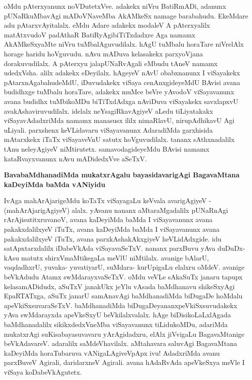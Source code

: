 \noindent
oMdu pAterxyanunx noVDutetxVve. adakekx niVru BatiRmADi, adanunx pUNaRkuMbavAgi mADoVNa\-veMba AkAMkeSx namage barabahudu. EkeMdare adu pAtarxvAyitalalx. eMdu Adare adakekx modaleV A pAterxyalilx matAtxvudoV padAthaR BatiRyAgibiTiTxdadxre Aga namamx AkAMkeSxyaMte niVru tuMbalAguvu\-dilalx. hAgU tuMbalu horaTare niVrelAlx horage haridu hoVguvudu. nAvu mADuva kela\-sakekx parxyoVjana dorakuvudilalx. A pAterxyu jalapUNaRvAgali eMbudu tAneV namamx udedxVsha. alilx adakekx eDeyilalx. hAgeyeV nAvU obabxnanunx I viSayakekx pAtarxnAgabahudeMdU, iDuvudakekx viSaya cenAnx\-gideyeMdU BAvisi avana budidhxge tuMbalu horaTare, adakekx muMce beVre yAvodoV viSayavanunx avana budidhx tuMbikoMDu biTiTxdAdxga nAviDuva viSayakekx savxlapxvU avakAshaviruvudilalx. idelalx neYsa\-giRkavAgiyeV aLedu tiLiyatakakx viSayavAdadxriMda namamx manasusx ililx nimaRlavU, nirupAdhikavU Agi uLiyali. parxshenx keVLidavaru viSayavanunx AdaradiMda garxhisida mAtarxkekx iTaTx viSayaveVnU satutx hoVguvudilalx. tananx sAthxnadalilx tAnu neleyAgiyeV niMtirutetx. samavodagideyeMdu BAvisi namamx kataRvayxvanunx nAvu mADidedxVve aSeTxV.

{\bigskip
\noindent
{\large\bf BavabaMdhanadiMda mukatxrAgalu bayasidavarigAgi BagavaMtana kaDeyiMda baMda vANiyidu}}\label{page251}
\medskip

\noindent
IvAga mahArAjarigeMdu koTaTx viSayagaLu keVvala avarigAgiyeV - (mahArAjarigAgiyeV) alalx. yAvanu nananx aMtaraMgadalilx pUNaRnAgi rArAjisutitxruvanoV, avana kaDeyiMda baMda I viSayavanunx avana pakakxdalilxyeV iTuTx, avana kaDeyiMda baMda I viSayavanunx avana pakakx\-dalilxyeV iTuTx, avana parxkAshakAkxgiyeV heVLidAdxgide. idu satApxtarxdalilx iDabeVkAda viSayavaSeTxV. nananx parxBuvu yAva duDuDx- kAsu matutx shirxVmaMtikegaLa meVlU niMtilalx. avanige bAlarU, vaqdadhxrU, yuvaka- yuvatiyarU, suMdara- kurUpigaLu elalxru oMdeV. avanige beVkAdudu Atamx swMdarayxvaSeTxV. oMdu veVLe sAkaSuTx janaru tapupx kelasamADidudx, aSuTxV janakUkx jeYlu vAsada baMdhanavu shikeSxyAgi EpaR\-TATxga, aSuTx janarU samAnavAgi baMdhanadiMda biDugaDe hoMdalu apeVkiSxsuvaraSeTxV. baMdhanadiMda biDugaDeyananxpeVkiSxsuvudakekx yAva swMdarayxda apeVkeSxyU beVkilalxvalalx. hAge biDisikoLaLxlAgada baMdha\-nadalilx sikikxdedxVneMba viSayavanunx tiLidukoMDu, adariMda mukatxrAgi suKisabayasuvavaru yArA\-gidadxru, elAlx jiVvigaLu BagavaMtanige beVkAdavareV. adaralilx saMdeVhavilalx. aMtahavara saluvAgi Baga\-vaMtana kaDeyiMda horaTubaruva vANigaLAgiveVpApx ivu! AdadxriMda avanu parxBuveV Agirali, dari\-darxneV Agirali. avana hAdaRvAda apeVkeSxya meVle I viSaya koDabeVkAgutetx.

